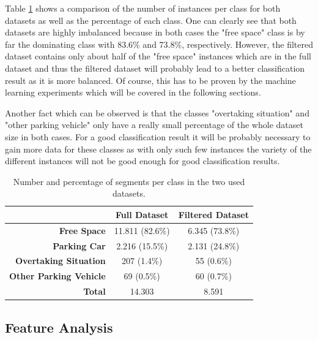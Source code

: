 Table \ref{table:dataset_comparison} shows a comparison of the number of instances per class for both datasets as well as the percentage of each class. One can clearly see that both datasets are highly imbalanced because in both cases the "free space" class is by far the dominating class with 83.6\% and 73.8\%, respectively. However, the filtered dataset contains only about half of the "free space" instances which are in the full dataset and thus the filtered dataset will probably lead to a better classification result as it is more balanced. Of course, this has to be proven by the machine learning experiments which will be covered in the following sections.

Another fact which can be observed is that the classes "overtaking situation" and "other parking vehicle" only have a really small percentage of the whole dataset size in both cases. For a good classification result it will be probably necessary to gain more data for these classes as with only such few instances the variety of the different instances will not be good enough for good classification results.
 
\begin{table}

\centering
\bgroup
\def\arraystretch{1.4}
\begin{tabular}{| r || c | c |}
\hline
   & 
   \textbf{Full Dataset} & 
   \textbf{Filtered Dataset} \\
\hline
   \textbf{Free Space} & 
   11.811 (82.6\%) & 
   6.345 (73.8\%) \\
\hline
   \textbf{Parking Car} & 
   2.216 (15.5\%) & 
   2.131 (24.8\%) \\
\hline
   \textbf{Overtaking Situation} & 
   207 (1.4\%) & 
   55 (0.6\%) \\
\hline
   \textbf{Other Parking Vehicle}& 
   69 (0.5\%) & 
   60 (0.7\%) \\
\hline
\hline
   \textbf{Total}& 
   14.303 & 
   8.591 \\
\hline

\end{tabular}
\egroup

\caption{Number and percentage of segments per class in the two used datasets.}
\label{table:dataset_comparison}
\end{table}





\subsection{Feature Analysis}
\label{sec:feature_analysis}

